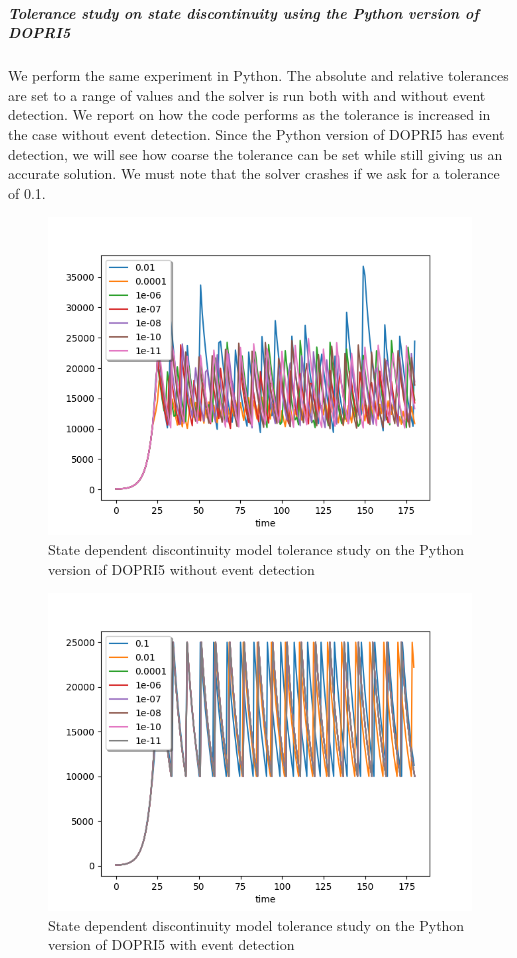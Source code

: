 \subparagraph{Tolerance study on state discontinuity using the Python version of DOPRI5}
We perform the same experiment in Python. The absolute and relative tolerances are set to a range of values and the solver is run both with and without event detection. We report on how the code performs as the tolerance is increased in the case without event detection. Since the Python version of DOPRI5 has event detection, we will see how coarse the tolerance can be set while still giving us an accurate solution. We must note that the solver crashes if we ask for a tolerance of 0.1.

\begin{figure}[h]
\centering
\includegraphics[width=0.7\linewidth]{./figures/tolerance_state_rk45_no_event_py}
\caption{State dependent discontinuity model tolerance study on the Python version of DOPRI5 without event detection}
\label{fig:tolerance_state_rk45_no_event_py}
\end{figure}

\begin{figure}[h]
\centering
\includegraphics[width=0.7\linewidth]{./figures/tolerance_state_rk45_with_event_py}
\caption{State dependent discontinuity model tolerance study on the Python version of DOPRI5 with event detection}
\label{fig:tolerance_state_rk45_with_event_py}
\end{figure}

